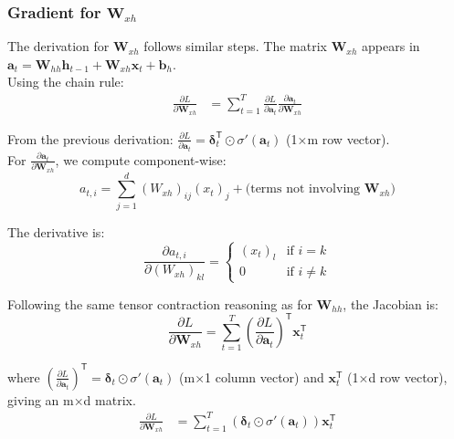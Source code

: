 \begin{notechapter}
\subsubsection{Gradient for $\mathbf{W}_{xh}$}

The derivation for $\mathbf{W}_{xh}$ follows similar steps. The matrix
$\mathbf{W}_{xh}$ appears in $\mathbf{a}_t = \mathbf{W}_{hh} \mathbf{h}_{t-1} +
\mathbf{W}_{xh} \mathbf{x}_t + \mathbf{b}_h$.\\

Using the chain rule:
\begin{align*}
    \frac{\partial L}{\partial \mathbf{W}_{xh}} 
&= \sum_{t=1}^{T} \frac{\partial L}{\partial \mathbf{a}_t} \frac{\partial
\mathbf{a}_t}{\partial \mathbf{W}_{xh}}
\end{align*}

From the previous derivation: $\frac{\partial L}{\partial \mathbf{a}_t} =
\bm{\delta}_t^\mathsf{T} \odot \sigma'(\mathbf{a}_t)$ (1×m row vector).
\vspace{1em}
\\
\indent For $\frac{\partial \mathbf{a}_t}{\partial \mathbf{W}_{xh}}$, we compute
component-wise:
\[
a_{t,i} = \sum_{j=1}^d (W_{xh})_{ij} (x_t)_j + \text{(terms not involving $\mathbf{W}_{xh}$)}
\]

The derivative is:
\[
\frac{\partial a_{t,i}}{\partial (W_{xh})_{kl}} = 
\begin{cases}
(x_t)_l & \text{if } i = k \\
0 & \text{if } i \neq k
\end{cases}
\]

Following the same tensor contraction reasoning as for $\mathbf{W}_{hh}$, 
the Jacobian is:
\[
\frac{\partial L}{\partial \mathbf{W}_{xh}} = 
\sum_{t=1}^{T} \left( \frac{\partial L}{\partial \mathbf{a}_t} \right)^\mathsf{T} 
\mathbf{x}_t^\mathsf{T}
\]

where $\left(\frac{\partial L}{\partial \mathbf{a}_t}\right)^\mathsf{T} = 
\bm{\delta}_t \odot \sigma'(\mathbf{a}_t)$ (m×1 column vector) and 
$\mathbf{x}_t^\mathsf{T}$ (1×d row vector), giving an m×d matrix.
%
\begin{align}
\frac{\partial L}{\partial \mathbf{W}_{xh}} &= \sum_{t=1}^{T} \left( \bm{\delta}_t
\odot \sigma'(\mathbf{a}_t) \right) \mathbf{x}_t^\mathsf{T} \label{chain-rule-to-bptt:eq:dWxh_detailed}
\end{align}


\end{notechapter}
